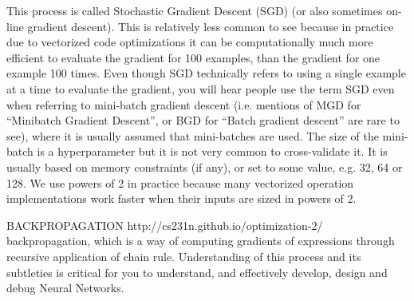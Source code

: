This process is called Stochastic Gradient Descent (SGD) (or also sometimes on-line gradient descent). 
This is relatively less common to see because in practice due to vectorized code optimizations it can be computationally much more efficient to evaluate the gradient for 100 examples,
than the gradient for one example 100 times. Even though SGD technically refers to using a single example at a time to evaluate the gradient, 
you will hear people use the term SGD even when referring to mini-batch gradient descent (i.e. mentions of MGD for “Minibatch Gradient Descent”, 
or BGD for “Batch gradient descent” are rare to see), where it is usually assumed that mini-batches are used. 
The size of the mini-batch is a hyperparameter but it is not very common to cross-validate it. 
It is usually based on memory constraints (if any), or set to some value, e.g. 32, 64 or 128. We use powers of 2 in practice because many vectorized operation implementations work 
faster when their inputs are sized in powers of 2.


BACKPROPAGATION
http://cs231n.github.io/optimization-2/
backpropagation, which is a way of computing gradients of expressions through recursive application of chain rule. 
Understanding of this process and its subtleties is critical for you to understand, and effectively develop, design and debug Neural Networks.